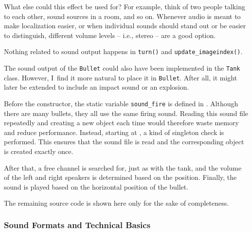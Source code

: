
What else could this effect be used for? For example, think of two people talking to each other, sound sources in a room, and so on. Whenever audio is meant to make localization easier, or when individual sounds should stand out or be easier to distinguish, different volume levels -- i.e., stereo -- are a good option.

Nothing related to sound output happens in \texttt{turn()} and \texttt{update\_imageindex()}.


The sound output of the \texttt{Bullet} could also have been implemented in the \texttt{Tank} class. However, I~find it more natural to place it in \texttt{Bullet}. After all, it might later be extended to include an impact sound or an explosion.

Before the constructor, the static variable \texttt{sound\_fire} is defined in . Although there are many bullets, they all use the same firing sound. Reading this sound file repeatedly and creating a new object each time would therefore waste memory and reduce performance. Instead, starting at , a kind of \gls{singleton} check is performed. This ensures that the sound file is read and the corresponding object is created exactly once.

After that, a free channel is searched for, just as with the tank, and the volume of the left and right speakers is determined based on the position.
Finally, the sound is played based on the horizontal position of the bullet.


The remaining source code is shown here only for the sake of completeness.



\subsubsection{Sound Formats and Technical Basics}


